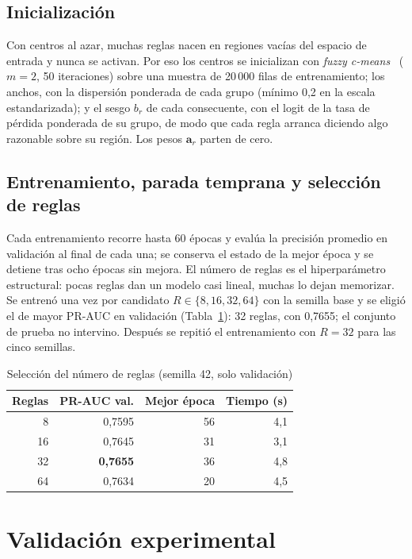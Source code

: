 \documentclass[conference]{IEEEtran}
\begin{document}
\subsection{Inicialización}

Con centros al azar, muchas reglas nacen en regiones vacías del espacio de
entrada y nunca se activan. Por eso los centros se inicializan con
\textit{fuzzy c-means}~\cite{bezdek} ($m = 2$, 50 iteraciones) sobre una
muestra de 20\,000 filas de entrenamiento; los anchos, con la dispersión
ponderada de cada grupo (mínimo 0,2 en la escala estandarizada); y el sesgo
$b_r$ de cada consecuente, con el logit de la tasa de pérdida ponderada de su
grupo, de modo que cada regla arranca diciendo algo razonable sobre su
región. Los pesos $\mathbf{a}_r$ parten de cero.

\subsection{Entrenamiento, parada temprana y selección de reglas}

Cada entrenamiento recorre hasta 60 épocas y evalúa la precisión promedio en
validación al final de cada una; se conserva el estado de la mejor época y se
detiene tras ocho épocas sin mejora. El número de reglas es el
hiperparámetro estructural: pocas reglas dan un modelo casi lineal, muchas lo
dejan memorizar. Se entrenó una vez por candidato $R \in \{8, 16, 32, 64\}$
con la semilla base y se eligió el de mayor PR-AUC en validación
(Tabla~\ref{tab:reglas}): 32 reglas, con 0,7655; el conjunto de prueba no
intervino. Después se repitió el entrenamiento con $R = 32$ para las cinco
semillas.

\begin{table}[htbp]
\caption{Selección del número de reglas (semilla 42, solo validación)}
\label{tab:reglas}
\centering
\footnotesize
\begin{tabular}{rrrr}
\toprule
\textbf{Reglas} & \textbf{PR-AUC val.} & \textbf{Mejor época} & \textbf{Tiempo (s)}\\
\midrule
8 & 0,7595 & 56 & 4,1\\
16 & 0,7645 & 31 & 3,1\\
32 & \textbf{0,7655} & 36 & 4,8\\
64 & 0,7634 & 20 & 4,5\\
\bottomrule
\end{tabular}
\end{table}

\section{Validación experimental}
\end{document}
